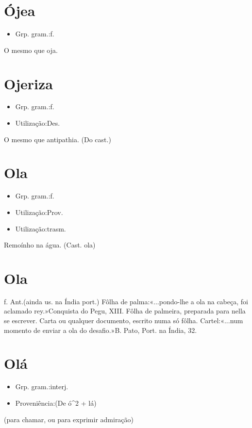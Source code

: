 \section{Ójea}
\begin{itemize}
\item {Grp. gram.:f.}
\end{itemize}
O mesmo que \textunderscore oja\textunderscore .
\section{Ojeriza}
\begin{itemize}
\item {Grp. gram.:f.}
\end{itemize}
\begin{itemize}
\item {Utilização:Des.}
\end{itemize}
O mesmo que \textunderscore antipathia\textunderscore .
(Do cast.)
\section{Ola}
\begin{itemize}
\item {Grp. gram.:f.}
\end{itemize}
\begin{itemize}
\item {Utilização:Prov.}
\end{itemize}
\begin{itemize}
\item {Utilização:trasm.}
\end{itemize}
Remoínho na água.
(Cast. \textunderscore ola\textunderscore )
\section{Ola}
\textunderscore f. Ant.\textunderscore  (ainda us. na Índia port.)
Fôlha de palma:«\textunderscore ...pondo-lhe a ola na cabeça, foi aclamado rey.\textunderscore »\textunderscore Conquista do Pegu\textunderscore , XIII.
Fôlha de palmeira, preparada para nella se escrever.
Carta ou qualquer documento, escrito numa só fôlha.
Cartel:«\textunderscore ...num momento de enviar a ola do desafio.\textunderscore »B. Pato, \textunderscore Port. na Índia\textunderscore , 32.
\section{Olá}
\begin{itemize}
\item {Grp. gram.:interj.}
\end{itemize}
\begin{itemize}
\item {Proveniência:(De \textunderscore ó\textunderscore ^2 + \textunderscore lá\textunderscore )}
\end{itemize}
(para chamar, ou para exprimir admiração)
